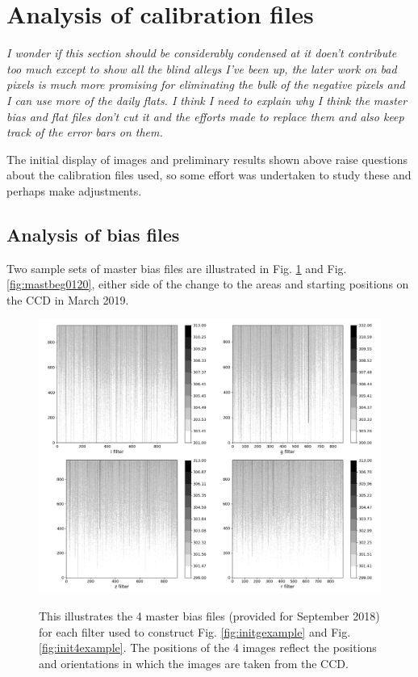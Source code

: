 \section{Analysis of calibration files}
\protect\label{section:analysiscalib}

\textit{I wonder if this section should be considerably condensed at it doen't
contribute too much except to show all the blind alleys I've been up, the later
work on bad pixels is much more promising for eliminating the bulk of the
negative pixels and I can use more of the daily flats. I think I need to
explain why I think the master bias and flat files don't cut it and the efforts
made to replace them and also keep track of the error bars on them.}

The initial display of images and preliminary results shown above raise
questions about the calibration files used, so some effort was undertaken to
study these and perhaps make adjustments.

\subsection{Analysis of bias files}
\protect\label{section:biasanal}

Two sample sets of master bias files are illustrated in Fig. \ref{fig:mastbeg0918} and Fig.
\ref{fig:mastbeg0120}, either side of the change to the areas and starting
positions on the CCD in March 2019.

\begin{figure}[!htbp]
\begin{center}
\includegraphics[scale=0.4]{images/mastbiaseg0918.png}
\end{center}   
\caption{This illustrates the 4 master bias files (provided for September
2018) for each filter used to construct Fig. \ref{fig:initgexample} and Fig.
\ref{fig:init4example}. The positions of the 4 images reflect the positions and orientations in which the
images are taken from the CCD.}
\protect\label{fig:mastbeg0918}
\end{figure}

